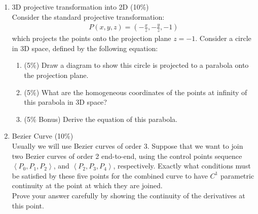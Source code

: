 \documentclass[fleqn]{article}
\begin{document}
\begin{enumerate}
   \item 3D projective transformation into 2D (10\%) \\
      Consider the standard projective transformation:
         \begin{align*}   
            P(x, y, z) = \left(-\frac{x}{z}, -\frac{y}{z}, -1\right)
         \end{align*}
      which projects the points onto the projection plane $z = -1$. Consider a circle in 3D space, defined by the following equation:
      \begin{enumerate}
         \item (5\%) Draw a diagram to show this circle is projected to a parabola onto the projection plane.
         \item (5\%) What are the homogeneous coordinates of the points at infinity of this parabola in 3D space? 
         \item (5\% Bonus) Derive the equation of this parabola.
      \end{enumerate}
   \item Bezier Curve (10\%) \\
      Usually we will use Bezier curves of order 3. Suppose that we want to join two Bezier curves of order 2 end-to-end, using the control points sequence $\left \langle P_0, P_1, P_2 \right \rangle$, and $\left \langle P_2, P_3, P_4 \right \rangle$, respectively.  Exactly what conditions must be satisfied by these five points for the combined curve to have $C^1$  parametric continuity at the point at which they are joined. \\
      Prove your answer carefully by showing the continuity of the derivatives at this point. \\
      \begin{minipage}[c]{\linewidth}
         \centering
\end{minipage}
\end{enumerate}
\end{document}
